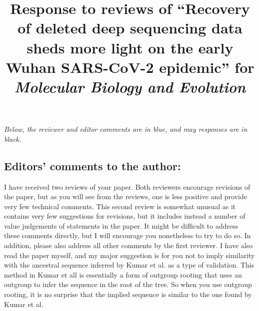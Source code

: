 \documentclass[11pt, oneside]{article}   	%
\title{Response to reviews of ``Recovery of deleted deep sequencing data sheds more light on the early Wuhan SARS-CoV-2 epidemic'' for \textit{Molecular Biology and Evolution}}
\author{}
\begin{document}
\maketitle

\emph{Below, the reviewer and editor comments {\color{blue} are in blue}, and may responses are in black.}

\color{blue}

\subsection*{Editors’ comments to the author:}

I have received two reviews of your paper.  Both reviewers encourage revisions of the paper, but as you will see from the reviews, one is less positive and provide very few technical comments.  This second review is somewhat unusual as it contains very few suggestions for revisions, but it includes instead a number of value judgements of statements in the paper.  It might be difficult to address these comments directly, but I will encourage you nonetheless to try to do so.  In addition, please also address all other comments by the first reviewer.  I have also read the paper myself, and my major suggestion is for you not to imply similarity with the ancestral sequence inferred by Kumar et al. as a type of validation.  This method in Kumar et all is essentially a form of outgroup rooting that uses an outgroup to infer the sequence in the root of the tree.  So when you use outgroup rooting, it is no surprise that the implied sequence is similar to the one found by Kumar et al.
\end{document}
